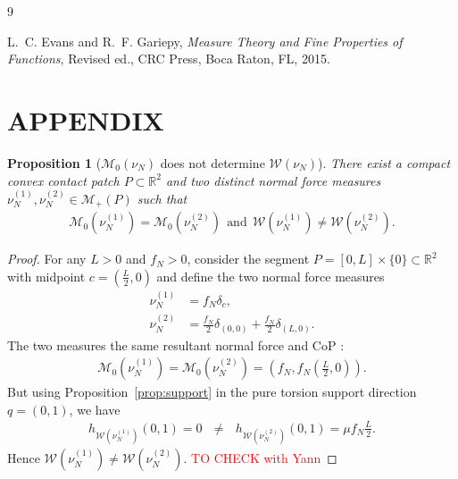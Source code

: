 \documentclass[11pt,a4paper]{article}
\theoremstyle{proposition}
\newtheorem{proposition}[theorem]{Proposition}
\begin{document}
\begin{thebibliography}{9}

L.~C. Evans and R.~F. Gariepy,
\newblock \emph{Measure Theory and Fine Properties of Functions},
\newblock Revised ed., CRC Press, Boca Raton, FL, 2015.



\end{thebibliography}
\newpage
\section*{APPENDIX}
\begin{proposition}[$\mathcal M_0(\nu_N)$ does not determine $\mathcal W(\nu_N)$]
    There exist a compact convex contact patch $P\subset\mathbb R^2$ and two
    distinct normal force measures $\nu_N^{(1)},\nu_N^{(2)}\in\mathcal M_+(P)$ such that
    \begin{align}
    \mathcal M_0(\nu_N^{(1)}) = \mathcal M_0(\nu_N^{(2)}) ~~\text{and}~~\mathcal W(\nu_N^{(1)})\neq\mathcal W(\nu_N^{(2)}).
    \end{align}
\end{proposition}
    \begin{proof}
    For any $L>0$ and $f_N>0$, consider the segment $P=[0,L]\times\{0\}\subset\mathbb R^2$ with midpoint $c=\left(\frac{L}{2},0\right)$ and define the two normal force measures
    \begin{align}
    \nu_N^{(1)}
    &=
    f_N\delta_c,\\
    \nu_N^{(2)}
    &=
    \frac{f_N}{2}\delta_{(0,0)}
    +
    \frac{f_N}{2}\delta_{(L,0)}.
    \end{align}
    The two measures the same resultant normal force and CoP :
    \begin{align}
    \mathcal M_0(\nu_N^{(1)}) = \mathcal M_0(\nu_N^{(2)}) = \left( f_N,f_N\left(\frac{L}{2},0\right)\right).
    \end{align}
    But using Proposition~\ref{prop:support} in the pure torsion support direction $q=(0,1)$, we have 
    \begin{align}
    h_{\mathcal W(\nu_N^{(1)})}(0,1)
    =
    0 ~~~\neq~~~
    h_{\mathcal W(\nu_N^{(2)})}(0,1)
    =
    \mu f_N\frac{L}{2}.
    \end{align}
    Hence $\mathcal W(\nu_N^{(1)}) \neq \mathcal W(\nu_N^{(2)})$. \textcolor{red}{TO CHECK with Yann}
\end{proof}
\end{document}
